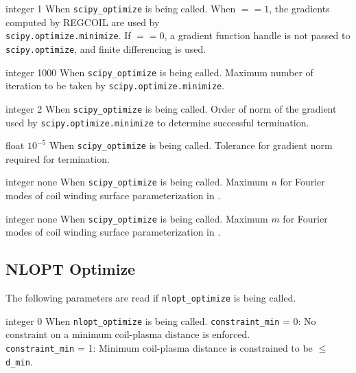 \myhrule

{integer}
{1}
{When \texttt{scipy\_optimize} is being called.}
{When  $ == 1$, the gradients computed by REGCOIL are used by \\ \texttt{scipy.optimize.minimize}. If  $ == 0$, a gradient function handle is not passed to \texttt{scipy.optimize}, and finite differencing is used.}

\myhrule

{integer}
{1000}
{When \texttt{scipy\_optimize} is being called.}
{Maximum number of iteration to be taken by \texttt{scipy.optimize.minimize}.}

\myhrule

{integer}
{2}
{When \texttt{scipy\_optimize} is being called.}
{Order of norm of the gradient used by \texttt{scipy.optimize.minimize} to determine successful termination.}

\myhrule

{float}
{$10^{-5}$}
{When \texttt{scipy\_optimize} is being called.}
{Tolerance for gradient norm required for termination.}

\myhrule

{integer}
{none}
{When \texttt{scipy\_optimize} is being called.}
{Maximum $n$ for Fourier modes of coil winding surface parameterization in .}

\myhrule

{integer}
{none}
{When \texttt{scipy\_optimize} is being called.}
{Maximum $m$ for Fourier modes of coil winding surface parameterization in .}

\myhrule

\subsection{NLOPT Optimize}

The following parameters are read if \texttt{nlopt\_optimize} is being called. 

{integer}
{0}
{When \texttt{nlopt\_optimize} is being called.}
{\texttt{constraint\_min} = 0: No constraint on a minimum coil-plasma distance is enforced. \\
 \texttt{constraint\_min} = 1: Minimum coil-plasma distance is constrained to be $\leq$ \texttt{d\_min}. }
 
\myhrule

